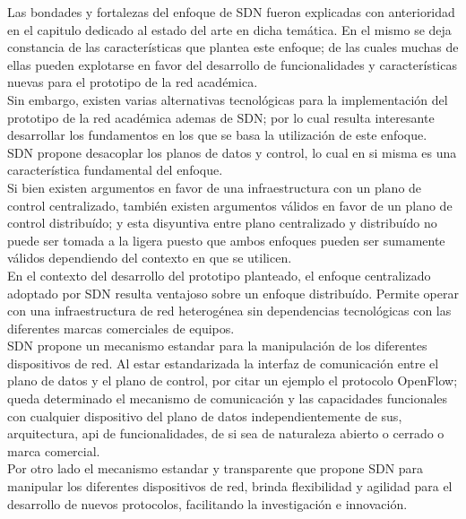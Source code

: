Las bondades y fortalezas del enfoque de SDN fueron explicadas con anterioridad en el capitulo dedicado al estado del arte en dicha tem\'atica. En el mismo se deja constancia de las caracter\'isticas que plantea este enfoque; de las cuales muchas de ellas pueden explotarse en favor del desarrollo de funcionalidades y caracter\'isticas nuevas para el prototipo de la red acad\'emica.\\

Sin embargo, existen varias alternativas tecnol\'ogicas para la implementaci\'on del prototipo de la red acad\'emica ademas de SDN; por lo cual resulta interesante desarrollar los fundamentos en los que se basa la utilizaci\'on de este enfoque.\\  

SDN propone desacoplar los planos de datos y control, lo cual en si misma es una caracter\'istica fundamental del enfoque.\\ 
Si bien existen argumentos en favor de una infraestructura con un plano de control centralizado, tambi\'en existen argumentos v\'alidos en favor de un plano de control distribu\'ido; y esta disyuntiva entre plano centralizado y distribu\'ido no puede ser tomada a la ligera puesto que ambos enfoques pueden ser sumamente v\'alidos dependiendo del contexto en que se utilicen.\\

En el contexto del desarrollo del prototipo planteado, el enfoque centralizado adoptado por SDN resulta ventajoso sobre un enfoque distribu\'ido. Permite operar con una infraestructura de red heterog\'enea sin dependencias tecnol\'ogicas con las diferentes marcas comerciales de equipos.\\

SDN propone un mecanismo estandar para la manipulaci\'on de los diferentes dispositivos de red. Al estar estandarizada la interfaz de comunicaci\'on entre el plano de datos y el plano de control, por citar un ejemplo el protocolo OpenFlow; queda determinado el mecanismo de comunicaci\'on y las capacidades funcionales con cualquier dispositivo del plano de datos independientemente de sus, arquitectura, api de funcionalidades, de si sea de naturaleza abierto o cerrado o marca comercial.\\ 

Por otro lado el mecanismo estandar y transparente que propone SDN para manipular los diferentes dispositivos de red, brinda flexibilidad y agilidad para el desarrollo de nuevos protocolos, facilitando la investigaci\'on e innovaci\'on.\\

